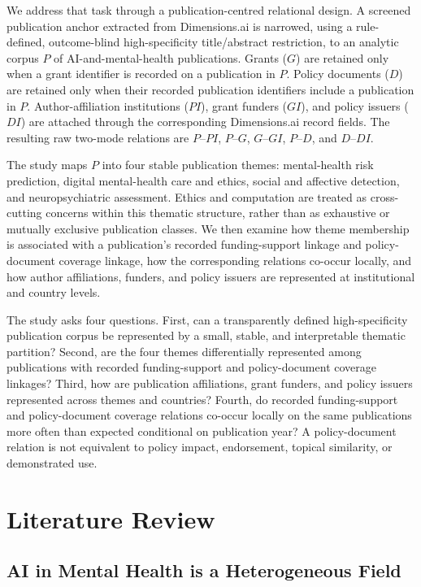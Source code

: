 \documentclass[12pt]{article}
\begin{document}
We address that task through a publication-centred relational design. A screened publication anchor extracted from Dimensions.ai is narrowed, using a rule-defined, outcome-blind high-specificity title/abstract restriction, to an analytic corpus $P$ of AI-and-mental-health publications. Grants ($G$) are retained only when a grant identifier is recorded on a publication in $P$. Policy documents ($D$) are retained only when their recorded publication identifiers include a publication in $P$. Author-affiliation institutions ($PI$), grant funders ($GI$), and policy issuers ($DI$) are attached through the corresponding Dimensions.ai record fields. The resulting raw two-mode relations are $P$--$PI$, $P$--$G$, $G$--$GI$, $P$--$D$, and $D$--$DI$.

The study maps $P$ into four stable publication themes: mental-health risk prediction, digital mental-health care and ethics, social and affective detection, and neuropsychiatric assessment. Ethics and computation are treated as cross-cutting concerns within this thematic structure, rather than as exhaustive or mutually exclusive publication classes. We then examine how theme membership is associated with a publication's recorded funding-support linkage and policy-document coverage linkage, how the corresponding relations co-occur locally, and how author affiliations, funders, and policy issuers are represented at institutional and country levels.

The study asks four questions. First, can a transparently defined high-specificity publication corpus be represented by a small, stable, and interpretable thematic partition? Second, are the four themes differentially represented among publications with recorded funding-support and policy-document coverage linkages? Third, how are publication affiliations, grant funders, and policy issuers represented across themes and countries? Fourth, do recorded funding-support and policy-document coverage relations co-occur locally on the same publications more often than expected conditional on publication year? A policy-document relation is not equivalent to policy impact, endorsement, topical similarity, or demonstrated use.

\section{Literature Review}

\subsection{AI in Mental Health is a Heterogeneous Field}
\end{document}
